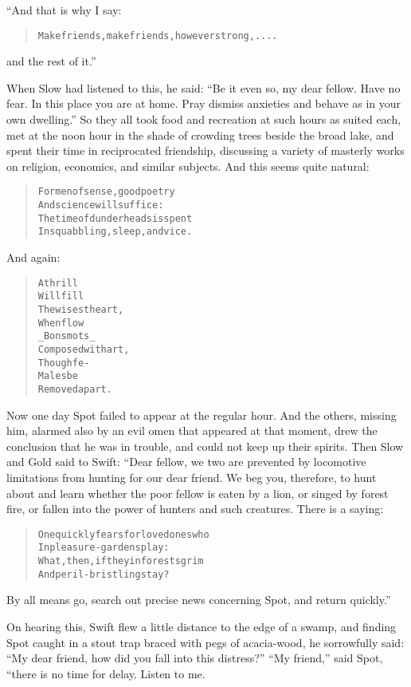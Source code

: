 \documentclass[article, twoside, 14pt]{memoir}
\renewenvironment{verbatim}{%
\begin{quote}%
\vskip -10pt%
\begin{alltt}\normalfont\large}{\end{alltt}%
\end{quote}%
\vskip -10pt
} %
\begin{document}
“And that is why I say:

\begin{verbatim}
Make friends, make friends, however strong, ....
\end{verbatim}
and the rest of it.”

When Slow had listened to this, he said:
``Be it even so, my dear fellow. Have no fear. In this place you are at home. Pray dismiss anxieties and behave as in your own dwelling.''
So they all took food and recreation at such hours as suited each,
met at the noon hour in the shade of crowding trees beside the
broad lake, and spent their time in reciprocated friendship,
discussing a variety of masterly works on religion, economics, and
similar subjects. And this seems quite natural:

\begin{verbatim}
For men of sense, good poetry
    And science will suffice:
The time of dunderheads is spent
    In squabbling, sleep, and vice.
\end{verbatim}
And again:

\begin{verbatim}
A thrill
Will fill
    The wisest heart,
When flow
_Bons mots_
    Composed with art,
Though fe-
Males be
    Removed apart.
\end{verbatim}
Now one day Spot failed to appear at the regular hour. And the
others, missing him, alarmed also by an evil omen that appeared at
that moment, drew the conclusion that he was in trouble, and could
not keep up their spirits. Then Slow and Gold said to Swift: “Dear
fellow, we two are prevented by locomotive limitations from hunting
for our dear friend. We beg you, therefore, to hunt about and learn
whether the poor fellow is eaten by a lion, or singed by forest
fire, or fallen into the power of hunters and such creatures. There
is a saying:

\begin{verbatim}
One quickly fears for loved ones who
    In pleasure-gardens play:
What, then, if they in forests grim
    And peril-bristling stay?
\end{verbatim}
By all means go, search out precise news concerning Spot, and
return quickly.”

On hearing this, Swift flew a little distance to the edge of a
swamp, and finding Spot caught in a stout trap braced with pegs of
acacia-wood, he sorrowfully said:
``My dear friend, how did you fall into this distress?''
``My friend,'' said Spot, “there is no time for delay. Listen to
me.
\end{document}

